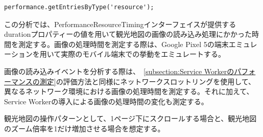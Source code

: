 \begin{lstlisting}[caption={Resource Timing APIによる画像の処理時間の取得},label={lst:Resource Timing APIによる画像の処理時間の取得}]
performance.getEntriesByType('resource');
\end{lstlisting}

この分析では、PerformanceResourceTimingインターフェイスが提供するdurationプロパティーの値を用いて観光地図の画像の読み込み処理にかかった時間を測定する。画像の処理時間を測定する際は、Google Pixel 5の端末エミュレーションを用いて実際のモバイル端末での挙動をエミュレートする。

画像の読み込みイベントを分析する際は、~\autoref{subsection:Service Workerのパフォーマンスの測定}の評価方法と同様にネットワークスロットリングを使用して、異なるネットワーク環境における画像の処理時間を測定する。それに加えて、Service Workerの導入による画像の処理時間の変化も測定する。

観光地図の操作パターンとして、1ページ下にスクロールする場合と、観光地図のズーム倍率を1だけ増加させる場合を想定する。